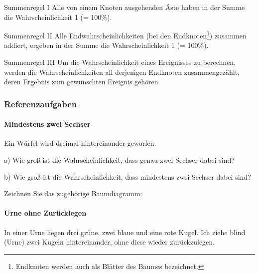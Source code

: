 \begin{gesetz}{Summenregel I}{}
Alle von einem Knoten ausgehenden Äste haben in der Summe die Wahrscheinlichkeit 1 (= 100\%).
\end{gesetz}

\begin{gesetz}{Summenregel II}{}
Alle Endwahrscheinlichkeiten (bei den Endknoten\footnote{Endknoten werden auch als Blätter des Baumes bezeichnet.}) zusammen addiert, ergeben in der Summe die Wahrscheinlichkeit 1 (= 100\%).
\end{gesetz}

\begin{gesetz}{Summenregel III}{}
  Um die Wahrscheinlichkeit eines Ereignisses zu berechnen, werden die
  Wahrscheinlichkeiten all derjenigen Endknoten zusammengezählt, deren Ergebnis zum gewünschten Ereignis gehören.
  \end{gesetz}

\newpage


\subsubsection{Referenzaufgaben}

\paragraph{Mindestens zwei Sechser} Ein Würfel wird dreimal hintereinander geworfen.

a) Wie groß ist die Wahrscheinlichkeit, dass genau zwei Sechser dabei sind?

b) Wie groß ist die Wahrscheinlichkeit, dass mindestens zwei Sechser dabei sind?


Zeichnen Sie das zugehörige Baumdiagramm:

\newpage


\paragraph{Urne ohne Zurücklegen} In einer Urne liegen drei grüne, zwei blaue und eine rote Kugel. Ich ziehe blind (Urne) zwei Kugeln hintereinander, ohne diese wieder zurückzulegen.

